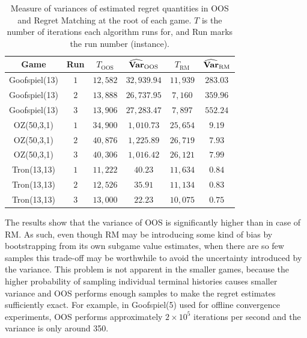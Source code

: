 {\begin{table}
\centering
\begin{footnotesize}
\begin{tabular}{|c||c|c|c|c|c|}
\hline
Game & Run & $T_{\text{OOS}}$ & $\widehat{\mathbf{Var}}_{\text{OOS}}$ & $T_{\text{RM}}$ & $\widehat{\mathbf{Var}}_{\text{RM}}$ \\
\hline
Goofspiel(13)	& $1$	& $12,582$	& $32,939.94$	& $11,939$	& $283.03$ \\
Goofspiel(13)	& $2$	& $13,888$	& $26,737.95$	& $7,160$	& $359.96$ \\
Goofspiel(13)	& $3$	& $13,906$	& $27,283.47$	& $7,897$	& $552.24$ \\
\hline
OZ(50,3,1) &	$1$ &	$34,900$	& $1,010.73$ & $25,654$	& $9.19$ \\
OZ(50,3,1) &	$2$	& $40,876$	& $1,225.89$ & $26,719$	& $7.93$ \\
OZ(50,3,1) &	$3$	& $40,306$	& $1,016.42$ & $26,121$	& $7.99$ \\
\hline
Tron(13,13) & $1$	& $11,222$	& $40.23$ & $11,634$ &	$0.84$ \\
Tron(13,13)	& $2$	& $12,526$	& $35.91$ & $11,134$	& $0.83$ \\
Tron(13,13)	& $3$	& $13,000$	& $22.23$ & $10,075$ & $0.75$ \\
\hline
\end{tabular}
\end{footnotesize}
\caption{Measure of variances of estimated regret quantities in OOS and Regret Matching at the root of each game.
$T$ is the number of iterations each algorithm runs for, and Run marks the run number (instance). \label{tab:oos_vs_rm}}
\end{table}

The results show that the variance of OOS is significantly higher than in case of RM. As such, even though RM may be introducing
some kind of bias by bootstrapping from its own subgame value estimates, when there are so few samples this trade-off may be worthwhile
to avoid the uncertainty introduced by the variance. This problem is not apparent in the smaller games, because the higher probability of sampling individual terminal histories causes smaller variance and OOS performs enough samples  to make the regret estimates sufficiently exact. For example, in Goofspiel(5) used for offline convergence experiments, OOS performs approximately $2 \times 10^5$ iterations per second and the variance is only around 350. 



}


